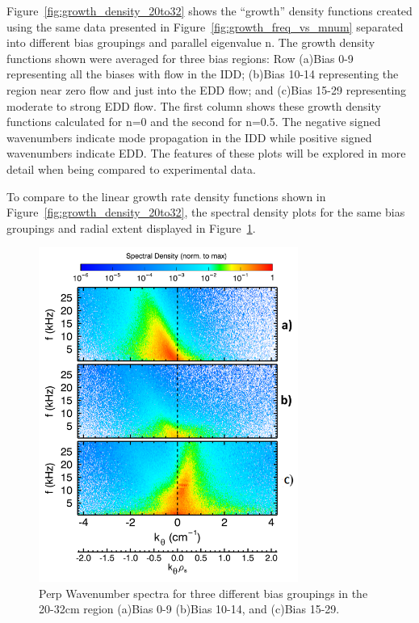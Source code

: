 \documentclass[aip,pop,amsmath,amssymb,reprint,superscriptaddress]{revtex4-1} %
\begin{document}
Figure~\ref{fig:growth_density_20to32} shows the ``growth'' density functions created using the same data presented in Figure~\ref{fig:growth_freq_vs_mnum} separated into different bias groupings and parallel eigenvalue n. The growth density functions shown were averaged for three bias regions: Row (a)Bias 0-9 representing all the biases with flow in the IDD; (b)Bias 10-14 representing the region near zero flow and just into the EDD flow; and (c)Bias 15-29 representing moderate to strong EDD flow. The first column shows these growth density functions calculated for n=0 and the second for n=0.5. The negative signed wavenumbers indicate mode propagation in the IDD while positive signed wavenumbers indicate EDD. The features of these plots will be explored in more detail when being compared to experimental data.

To compare to the linear growth rate density functions shown in Figure~\ref{fig:growth_density_20to32}, the spectral density plots for the same bias groupings and radial extent displayed in Figure~\ref{fig:k_spec_edge_3bias}.

\begin{figure}[!htbp]
\centerline{
\includegraphics[width=8.5cm]{k_spec_edge_3bias_lab}}%
\caption{\label{fig:k_spec_edge_3bias} Perp Wavenumber spectra for three different bias groupings in the 20-32cm region (a)Bias 0-9 (b)Bias 10-14, and (c)Bias 15-29.}
\end{figure}
\end{document}
